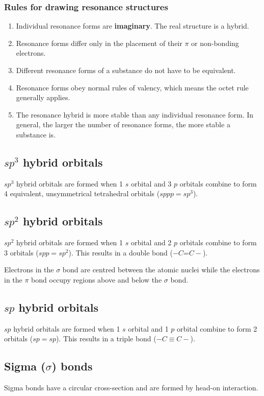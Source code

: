 \documentclass[11pt]{article}
\begin{document}
\subsubsection{Rules for drawing resonance structures}
\label{sec:org3fd7d28}
\begin{enumerate}
\item Individual resonance forms are \textbf{imaginary}. The real structure is a hybrid.
\item Resonance forms differ only in the placement of their \(\pi\) or non-bonding electrons.
\item Different resonance forms of a substance do not have to be equivalent.
\item Resonance forms obey normal rules of valency, which means the octet rule generally applies.
\item The resonance hybrid is more stable than any individual resonance form. In general, the larger the number of resonance forms, the more stable a substance is.
\end{enumerate}
\subsection{\(sp^3\) hybrid orbitals}
\label{sec:orgfe2f4a6}
\(sp^3\) hybrid orbitals are formed when 1 \(s\) orbital and 3 \(p\) orbitals combine to form 4 equivalent, unsymmetrical tetrahedral orbitals (\(sppp = sp^3\)).
\subsection{\(sp^2\) hybrid orbitals}
\label{sec:orgdf0a5c4}
\(sp^2\) hybrid orbitals are formed when 1 \(s\) orbital and 2 \(p\) orbitals combine to form 3 orbitals (\(spp = sp^2\)). This results in a double bond (\(- C\)=\(C -\)).


Electrons in the \(\sigma\) bond are centred between the atomic nuclei while the electrons in the \(\pi\) bond occupy regions above and below the \(\sigma\) bond.
\subsection{\(sp\) hybrid orbitals}
\label{sec:org9bc3e1a}
\(sp\) hybrid orbitals are formed when 1 \(s\) orbital and 1 \(p\) orbital combine to form 2 orbitals (\(sp = sp\)). This results in a triple bond (\(- C \equiv C -\)).
\subsection{Sigma (\(\sigma\)) bonds}
\label{sec:org1e463de}
Sigma bonds have a circular cross-section and are formed by head-on interaction.
\end{document}
